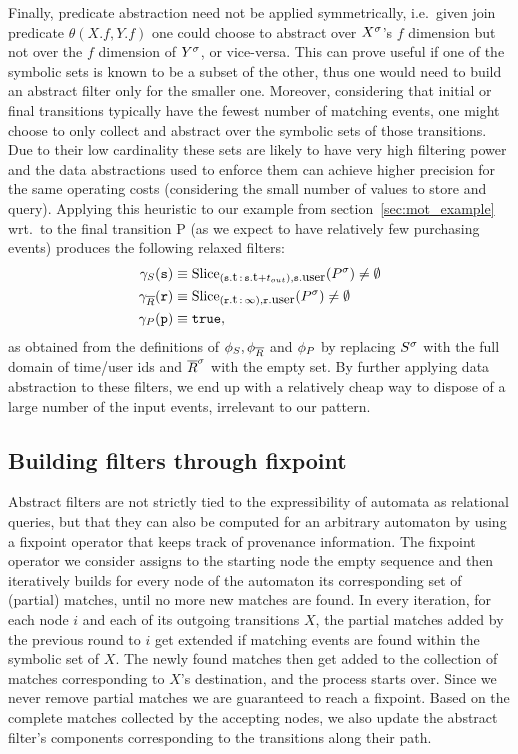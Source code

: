 Finally, predicate abstraction need not be applied symmetrically,
i.e.\ given join predicate $\theta(X.f, Y.f)$ one could choose to abstract over 
${X}^{\sigma}$'s $f$ dimension but not over the $f$ dimension of ${Y}^{\sigma}$, or 
vice-versa.  
This can prove useful if one of the symbolic sets is known to be a subset of 
the other, thus one would need to build an abstract filter only for the smaller 
one. 
Moreover, considering that initial or final transitions typically have the 
fewest number of matching events, one might choose to only collect and abstract 
over the symbolic sets of those transitions.
Due to their low cardinality these sets are likely to have very high 
filtering power and the data abstractions used to enforce them can achieve 
higher precision for the same operating costs (considering the small number of 
values to store and query).
Applying this heuristic to our example from section~\ref{sec:mot_example} wrt.\ 
to the final transition P (as we expect to have relatively few purchasing 
events) produces the following relaxed filters:
\begin{align*}
\heurs{S}(\symv{s}) 
&\equiv  
\slice{\syms{P}}
{(\facc{\symv{s}}{t}\,:\,\facc{\symv{s}}{t} + t_{out}),
	\facc{\symv{s}}{user}} 
\neq \emptyset
\\
\heurs{\oR}(\symv{r}) 
&\equiv
\slice{\syms{P}}{(\facc{\symv{r}}{t}\,:\,\infty), \facc{\symv{r}}{user}}
\neq \emptyset
\\
\heurs{P}(\symv{p}) 
&\equiv \texttt{true},
\end{align*}
as obtained 
from the definitions of $\phi_{S}, \phi_{\overline{R}}$ and $\phi_{P}$
by replacing ${S}^{\sigma}$ with the full domain of time/user ids and  
${\overline{R}}^{\sigma}$ with the empty set. 
By further applying data abstraction to these filters, we end up with a 
relatively cheap way to dispose of a large number of the input events, 
irrelevant to our pattern.  

\subsection{Building filters through fixpoint}


Abstract filters are not strictly tied to the  
expressibility of automata as relational queries, but that they can also be 
computed for an arbitrary automaton by using a fixpoint operator that keeps 
track of provenance information.
The fixpoint operator we consider assigns to the starting node the empty 
sequence and then iteratively builds for every node of the automaton its 
corresponding set of (partial) matches, until no more new matches are found. 
In every iteration, for each node $i$ and each of its outgoing transitions $X$, 
the partial matches added by the previous round to $i$ get extended if matching 
events are found within the symbolic set of $X$. 
The newly found matches then get added to the collection of matches 
corresponding to $X$'s destination, and the process starts over.  
Since we never remove partial matches we are guaranteed to reach a fixpoint.
Based on the complete matches collected by the accepting nodes, we also update 
the abstract filter's components corresponding to the transitions along their 
path.

